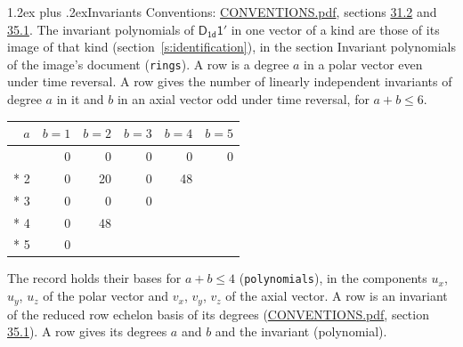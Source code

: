 \documentclass[10pt,a4paper]{article}
\makeatletter
\renewcommand\section{\@startsection{section}{1}{\z@}{-3ex plus -1ex minus -.2ex}%
  {1.2ex plus .2ex}{\normalfont\large\sffamily\bfseries\color{parttitle}}}
\numberwithin{equation}{section}
\newcommand{\grp}[1]{\mathsf{#1}}
\makeatother
\begin{document}
\section{Invariants}\label{s:invariants}
Conventions: \href{../../CONVENTIONS.pdf}{CONVENTIONS.pdf}, sections \href{../../CONVENTIONS.pdf\#conv.31.2}{31.2} and \href{../../CONVENTIONS.pdf\#conv.35.1}{35.1}.
The invariant polynomials of $\grp{D_{1d}1'}$ in one vector of a kind are those of its image of that kind (section~\ref{s:identification}), in the section Invariant polynomials of the image's document (\texttt{rings}).
\leavevmode\label{n:index.degree.polar}\label{n:index.degree.axial}A row is a degree $a$ in a polar vector even under time reversal. A row gives the number of linearly independent invariants of degree $a$ in it and $b$ in an axial vector odd under time reversal, for $a + b \le 6$.
{\small\begin{longtable}{@{}rrrrrr@{}}\toprule
$a$ & $b = 1$ & $b = 2$ & $b = 3$ & $b = 4$ & $b = 5$\\\midrule\endhead
\bottomrule\endfoot\endlastfoot
1 & 0 & 0 & 0 & 0 & 0\\*
2 & 0 & 20 & 0 & 48 & \\*
3 & 0 & 0 & 0 &  & \\*
4 & 0 & 48 &  &  & \\*
5 & 0 &  &  &  & \\
\bottomrule\end{longtable}}
\leavevmode\label{n:local.component.polar}\label{n:local.component.axial}The record holds their bases for $a + b \le 4$ (\texttt{polynomials}), in the components $u_{x}$, $u_{y}$, $u_{z}$ of the polar vector and $v_{x}$, $v_{y}$, $v_{z}$ of the axial vector. \label{n:head.polynomial}A row is an invariant of the reduced row echelon basis of its degrees (\href{../../CONVENTIONS.pdf}{CONVENTIONS.pdf}, section \href{../../CONVENTIONS.pdf\#conv.35.1}{35.1}). A row gives its degrees $a$ and $b$ and the invariant (polynomial).
\end{document}

